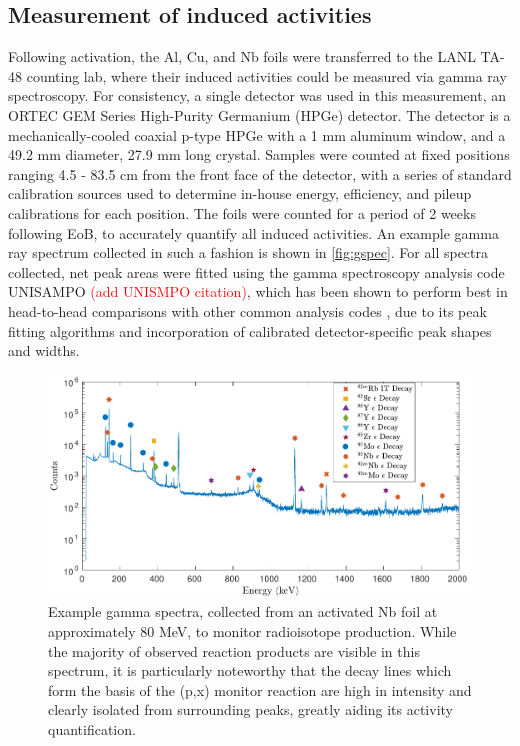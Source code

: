 \documentclass[3p]{elsarticle}
\newcommand{\textred}[1]{\textcolor{red}{ #1}}
\newcommand{\comment}[1]{\todo[color=blue!20!white,inline]{ASV: #1}}
\begin{document}
\subsection{Measurement of induced activities}\label{sec:spectroscopy}

\comment{get citation data for UNISAMPO}

Following activation, the Al, Cu, and Nb foils  were  transferred to the LANL TA-48 counting lab, where their induced activities could be measured via gamma ray spectroscopy.
For consistency, a single detector was used in this measurement, an ORTEC GEM Series  High-Purity Germanium (HPGe) detector.
The detector is a mechanically-cooled coaxial p-type HPGe with a 1 mm aluminum window, and a 49.2 mm diameter, 27.9 mm long crystal.
Samples were counted at fixed positions ranging 4.5 - 83.5  cm from the front face of the detector, with a series of standard calibration sources used to determine in-house energy, efficiency, and pileup calibrations for each position.
The foils were counted for a period of 2 weeks following EoB, to accurately quantify all induced activities.
An example gamma ray spectrum collected in such a fashion is shown in \autoref{fig:gspec}.
For all spectra collected, net peak areas were fitted using the gamma spectroscopy analysis code UNISAMPO \textred{(add UNISMPO citation)}, which has been shown to perform best in head-to-head comparisons with other common analysis codes \cite{Jackman2014}, due to its peak fitting algorithms and incorporation  of calibrated detector-specific peak shapes and widths. 

\begin{figure}[ht]
 \centering
 \includegraphics[width=6in]{./figures/sample_gspec.pdf}
 \caption{Example gamma spectra, collected from an activated Nb foil at approximately 80 MeV, to monitor radioisotope production. While the majority of observed reaction products are visible in this spectrum, it is particularly noteworthy that the  decay lines which form the basis of the (p,x) monitor reaction are high in intensity and clearly isolated from surrounding peaks, greatly aiding its activity quantification.}
 \label{fig:gspec}
\end{figure}
\end{document}
